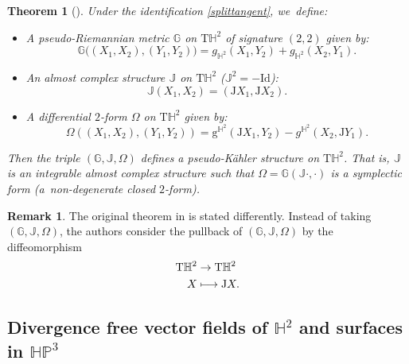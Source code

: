 \documentclass[10pt]{amsart}
\newcommand\mto{\mathchoice{\longmapsto}{\mapsto}{\mapsto}{\mapsto}}
\theoremstyle{plain}
\newtheorem{theorem}[cor]{Theorem}
\theoremstyle{definition}
\newtheorem{remark}[cor]{Remark}
\newcommand{\HP}{\mathbb{HP}^3}
\begin{document}
\begin{theorem}[\cite{canonical_pseudo}]\label{canonical_pseudo}
Under the identification \eqref{splittangent}, we~define:
\begin{itemize}
\item A pseudo-Riemannian metric $\mathbb{G}$ on $\mathrm{T}\mathbb{H}^2$ of signature $(2,2)$ given by:
\[
\mathbb{G}\big((X_1,X_2),(Y_1,Y_2)\big)=g_{\mathbb{H}^2}(X_1,Y_2)+g_{\mathbb{H}^2}(X_2,Y_1).
\]
\item An almost complex structure $\mathbb{J}$ on $\mathrm{T}\mathbb{H}^2$ (\ie $\mathbb{J}^2=-\mathrm{Id}$):
\[
\mathbb{J}(X_1,X_2)=(\mathrm{J}X_1,\mathrm{J}X_2).
\]
\item A differential $2$-form $\Omega$ on $\mathrm{T}\mathbb{H}^2$ given by:
\[
\Omega((X_1,X_2),(Y_1,Y_2))=\mathrm{g}^{\mathbb{H}^2}(\mathrm{J}X_1,Y_2)-g^{\mathbb{H}^{2}}(X_2,\mathrm{J}Y_1).
\]
\end{itemize}
Then the triple $(\mathbb{G},\mathbb{J},\Omega)$ defines a pseudo-Kähler structure on $\mathrm{T}\mathbb{H}^2$. That is, $\mathbb{J}$ is an integrable almost complex structure such that $\Omega=\mathbb{G}(\mathbb{J}\cdot,\cdot)$ is a symplectic form (a~non-degenerate closed $2$-form).
\end{theorem}
\begin{remark}
The original theorem in \cite{canonical_pseudo} is stated differently. Instead of taking $(\mathbb{G},\mathbb{J},\Omega)$, the authors consider the pullback of $(\mathbb{G},\mathbb{J},\Omega)$ by the diffeomorphism
\[
\begin{aligned}
\mathrm{T}\mathbb{H}^2 & \to \mathrm{T}\mathbb{H}^2 \\
X & \mto \mathrm{J}X.
\end{aligned}
\]
\end{remark}

\subsection{Divergence free vector fields of \texorpdfstring{$\mathbb{H}^2$}{H2}
and surfaces in \texorpdfstring{$\HP$}{HP}}
\end{document}

